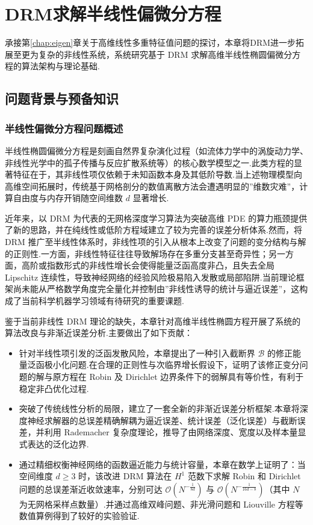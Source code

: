\chapter{DRM求解半线性偏微分方程}
承接第\ref{chap:eigen}章关于高维线性多重特征值问题的探讨，本章将DRM进一步拓展至更为复杂的非线性系统，系统研究基于 DRM 求解高维半线性椭圆偏微分方程的算法架构与理论基础.
\section{问题背景与预备知识}\label{sec:pre}
\subsection{半线性偏微分方程问题概述}
半线性椭圆偏微分方程是刻画自然界复杂演化过程（如流体力学中的涡旋动力学、非线性光学中的孤子传播与反应扩散系统等）的核心数学模型之一\cite{nonlinearbook}.此类方程的显著特征在于，其非线性项仅依赖于未知函数本身及其低阶导数.当上述物理模型向高维空间拓展时，传统基于网格剖分的数值离散方法会遭遇明显的”维数灾难”，计算自由度与内存开销随空间维数 $d$ 显著增长.

近年来，以 DRM 为代表的无网格深度学习算法为突破高维 PDE 的算力瓶颈提供了新的思路，并在纯线性或低阶方程域建立了较为完善的误差分析体系.然而，将 DRM 推广至半线性体系时，非线性项的引入从根本上改变了问题的变分结构与解的正则性.一方面，非线性特征往往导致解场存在多重分支甚至奇异性；另一方面，高阶或指数形式的非线性增长会使得能量泛函高度非凸，且失去全局 Lipschitz 连续性，导致神经网络的经验风险极易陷入发散或局部陷阱.当前理论框架尚未能从严格数学角度完全量化并控制由”非线性诱导的统计与逼近误差”，这构成了当前科学机器学习领域有待研究的重要课题.

鉴于当前非线性 DRM 理论的缺失，本章针对高维半线性椭圆方程开展了系统的算法改良与非渐近误差分析.主要做出了如下贡献：
\begin{itemize}
\item 针对半线性项引发的泛函发散风险，本章提出了一种引入截断界 $\mathcal{B}$ 的修正能量泛函极小化问题.在合理的正则性与次临界增长假设下，证明了该修正变分问题的解与原方程在 Robin 及 Dirichlet 边界条件下的弱解具有等价性，有利于稳定非凸优化过程.
\item 突破了传统线性分析的局限，建立了一套全新的非渐近误差分析框架.本章将深度神经求解器的总误差精确解耦为逼近误差、统计误差（泛化误差）与截断误差，并利用 Rademacher 复杂度理论，推导了由网络深度、宽度以及样本量显式表达的泛化边界.
\item 通过精细权衡神经网络的函数逼近能力与统计容量，本章在数学上证明了：当空间维度 $d \ge 3$ 时，该改进 DRM 算法在 $H^1$ 范数下求解 Robin 和 Dirichlet 问题的总误差渐近收敛速率，分别可达 $\mathcal{O}(N^{-\frac{1}{8d}})$ 与 $\mathcal{O}(N^{-\frac{1}{16d-8}})$（其中 $N$ 为无网格采样点数量）.并通过高维双峰问题、非光滑问题和 Liouville 方程等数值算例得到了较好的实验验证.
\end{itemize}


